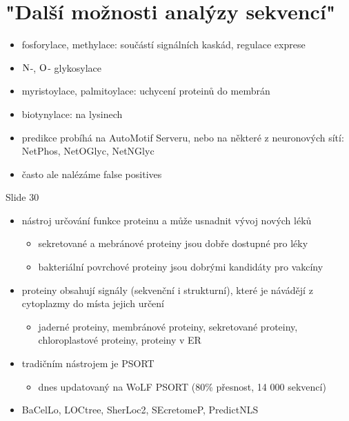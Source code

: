 \documentclass[DIV=8]{scrreprt}
\begin{document}
\section{"Další možnosti analýzy sekvencí"}

\begin{itemize}
    \item fosforylace, methylace: součástí signálních kaskád, regulace exprese
    \item \(\ce{N}\)-, \(\ce{O}\)- glykosylace
    \item myristoylace, palmitoylace: uchycení proteinů do membrán
    \item biotynylace: na lysinech
\end{itemize}


\begin{itemize}
    \item predikce probíhá na AutoMotif Serveru, nebo na některé z neuronových sítí: NetPhos, NetOGlyc, NetNGlyc
    \item často ale nalézáme false positives
\end{itemize}


Slide 30
\begin{itemize}
    \item nástroj určování funkce proteinu a může usnadnit vývoj nových léků
\begin{itemize}
    \item sekretované a mebránové proteiny jsou dobře dostupné pro léky
    \item bakteriální povrchové proteiny jsou dobrými kandidáty pro vakcíny
\end{itemize}

    \item proteiny obsahují signály (sekvenční i strukturní), které je návádějí z cytoplazmy do místa jejich určení
\begin{itemize}
    \item jaderné proteiny, membránové proteiny, sekretované proteiny, chloroplastové proteiny, proteiny v ER
\end{itemize}

    \item tradičním nástrojem je PSORT
\begin{itemize}
    \item dnes updatovaný na WoLF PSORT (80\% přesnost, 14 000 sekvencí)
\end{itemize}

    \item BaCelLo, LOCtree, SherLoc2, SEcretomeP, PredictNLS
\end{itemize}
\end{document}
